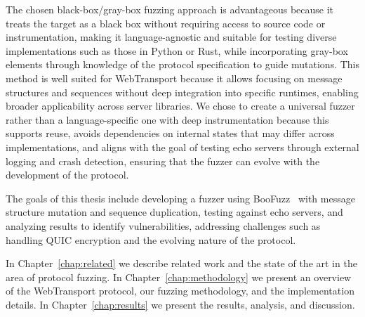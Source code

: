 The chosen black-box/gray-box fuzzing approach is advantageous because it treats the target as a black box without requiring access to source code or instrumentation, making it language-agnostic and suitable for testing diverse implementations such as those in Python or Rust, while incorporating gray-box elements through knowledge of the protocol specification to guide mutations. This method is well suited for WebTransport because it allows focusing on message structures and sequences without deep integration into specific runtimes, enabling broader applicability across server libraries. We chose to create a universal fuzzer rather than a language-specific one with deep instrumentation because this supports reuse, avoids dependencies on internal states that may differ across implementations, and aligns with the goal of testing echo servers through external logging and crash detection, ensuring that the fuzzer can evolve with the development of the protocol.

The goals of this thesis include developing a fuzzer using BooFuzz~\cite{boofuzz_docs, boofuzz_github} with message structure mutation and sequence duplication, testing against echo servers, and analyzing results to identify vulnerabilities, addressing challenges such as handling QUIC encryption and the evolving nature of the protocol.

In Chapter~\ref{chap:related} we describe related work and the state of the art in the area of protocol fuzzing. In Chapter~\ref{chap:methodology} we present an overview of the WebTransport protocol, our fuzzing methodology, and the implementation details. In Chapter~\ref{chap:results} we present the results, analysis, and discussion.
